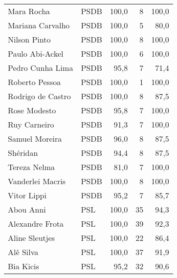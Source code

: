 \begin{longtable}{llrrr}
                          Mara Rocha &           PSDB &     100,0 &            8 &      100,0 \\
                    Mariana Carvalho &           PSDB &     100,0 &            5 &       80,0 \\
                        Nilson Pinto &           PSDB &     100,0 &            8 &      100,0 \\
                     Paulo Abi-Ackel &           PSDB &     100,0 &            6 &      100,0 \\
                    Pedro Cunha Lima &           PSDB &      95,8 &            7 &       71,4 \\
                      Roberto Pessoa &           PSDB &     100,0 &            1 &      100,0 \\
                   Rodrigo de Castro &           PSDB &     100,0 &            8 &       87,5 \\
                        Rose Modesto &           PSDB &      95,8 &            7 &      100,0 \\
                        Ruy Carneiro &           PSDB &      91,3 &            7 &      100,0 \\
                      Samuel Moreira &           PSDB &      96,0 &            8 &       87,5 \\
                            Shéridan &           PSDB &      94,4 &            8 &       87,5 \\
                        Tereza Nelma &           PSDB &      81,0 &            7 &      100,0 \\
                    Vanderlei Macris &           PSDB &     100,0 &            8 &      100,0 \\
                         Vitor Lippi &           PSDB &      95,2 &            7 &       85,7 \\
                           Abou Anni &            PSL &     100,0 &           35 &       94,3 \\
                     Alexandre Frota &            PSL &     100,0 &           39 &       92,3 \\
                      Aline Sleutjes &            PSL &     100,0 &           22 &       86,4 \\
                           Alê Silva &            PSL &     100,0 &           37 &       91,9 \\
                           Bia Kicis &            PSL &      95,2 &           32 &       90,6 \\

\end{longtable}
